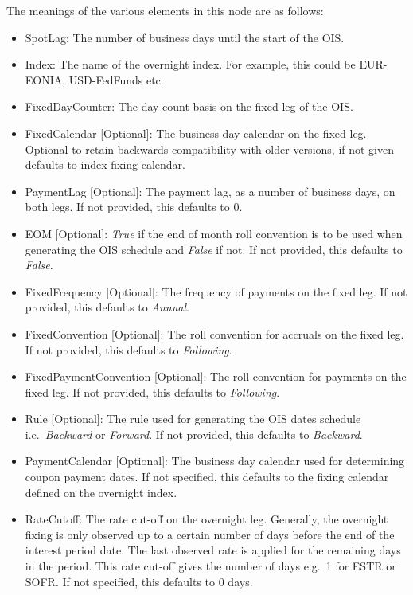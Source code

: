 The meanings of the various elements in this node are as follows:
\begin{itemize}
\item SpotLag: The number of business days until the start of the OIS.
\item Index: The name of the overnight index. For example, this could be EUR-EONIA, USD-FedFunds etc.
\item FixedDayCounter: The day count basis on the fixed leg of the OIS.
\item FixedCalendar [Optional]: The business day calendar on the fixed leg. Optional to retain backwards compatibility
  with older versions, if not given defaults to index fixing calendar.
\item PaymentLag [Optional]: The payment lag, as a number of business days, on both legs. If not provided, this defaults
to 0.
\item EOM [Optional]: \emph{True} if the end of month roll convention is to be used when generating the OIS schedule and
\emph{False} if not. If not provided, this defaults to \emph{False}.
\item FixedFrequency [Optional]: The frequency of payments on the fixed leg. If not provided, this defaults to
\emph{Annual}.
\item FixedConvention [Optional]: The roll convention for accruals on the fixed leg. If not provided, this defaults to
\emph{Following}.
\item FixedPaymentConvention [Optional]: The roll convention for payments on the fixed leg. If not provided, this
defaults to \emph{Following}.
\item Rule [Optional]: The rule used for generating the OIS dates schedule i.e.\ \emph{Backward} or \emph{Forward}. If
not provided, this defaults to \emph{Backward}.
\item PaymentCalendar [Optional]: The business day calendar used for determining coupon payment dates.
If not specified, this defaults to the fixing calendar defined on the overnight index.
\item RateCutoff: The rate cut-off on the overnight leg. Generally, the overnight fixing
is only observed up to a certain number of days before the end of the interest period date.
The last observed rate is applied for the remaining days in the period.
This rate cut-off gives the number of days e.g.\ 1 for ESTR or SOFR.
If not specified, this defaults to 0 days.
\end{itemize}


